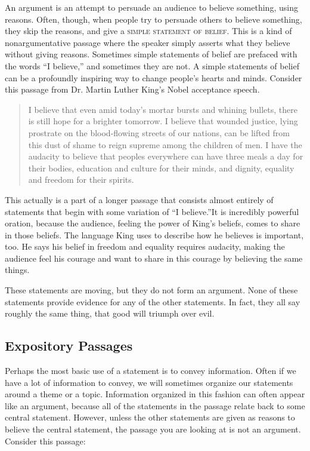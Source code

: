 An argument is an attempt to persuade an audience to believe something, using reasons. Often, though, when people try to persuade others to believe something, they skip the reasons, and give a \textsc{\gls{simple statement of belief}}. \label{def:simple_statement_of_belief} This is a kind of nonargumentative passage where the speaker simply asserts what they believe without giving reasons. Sometimes simple statements of belief are prefaced with the words ``I believe,'' and sometimes they are not. A simple statements of belief can be a profoundly inspiring way to change people's hearts and minds. Consider this passage from Dr. Martin Luther King's Nobel acceptance speech.

\begin{quotation} \noindent I believe that even amid today's mortar bursts and whining bullets, there is still hope for a brighter tomorrow. I believe that wounded justice, lying prostrate on the blood-flowing streets of our nations, can be lifted from this dust of shame to reign supreme among the children of men. I have the audacity to believe that peoples everywhere can have three meals a day for their bodies, education and culture for their minds, and dignity, equality and freedom for their spirits. \citep{King2001} \end{quotation}

This actually is a part of a longer passage that consists almost entirely of statements that begin with some variation of ``I believe.''It is incredibly powerful oration, because the audience, feeling the power of King's beliefs, comes to share in those beliefs. The language King uses to describe how he believes is important, too. He says his belief in freedom and equality requires audacity, making the audience feel his courage and want to share in this courage by believing the same things. 

These statements are moving, but they do not form an argument. None of these statements provide evidence for any of the other statements. In fact, they all say roughly the same thing, that good will triumph over evil. %
  
\subsection{Expository Passages}

Perhaps the most basic use of a statement is to convey information. Often if we have a lot of information to convey, we will sometimes organize our statements around a theme or a topic. Information organized in this fashion can often appear like an argument, because all of the statements in the passage relate back to some central statement. However, unless the other statements are given as reasons to believe the central statement, the passage you are looking at is not an argument. Consider this passage:

